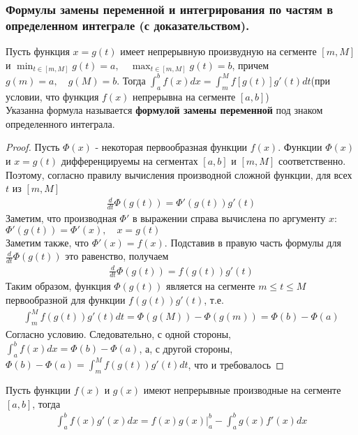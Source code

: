 \documentclass[10pt]{article}
\begin{document}
    \subsubsection{Формулы замены переменной и интегрирования по частям в определенном интеграле (с доказательством).}
    \begin{theorem}
        Пусть функция $x = g(t)$ имеет непрерывную произвудную на сегменте $[m, M]$ и $\min_{t \in [m, M]} g(t) = a, \quad \max_{t \in [m, M]} g(t) = b$, причем $g(m) = a, \quad g(M) = b$. Тогда $\int_a^b f(x) dx = \int_m^M f[g(t)]g'(t) dt$(при условии, что функция $f(x)$ непрерывна на сегменте $[a, b]$)\\
        Указанна формула называется \textbf{формулой замены переменной} под знаком определенного интеграла.
    \end{theorem}
    \begin{proof}
        Пусть $\Phi(x)$ - некоторая первообразная функции $f(x)$. Функции $\Phi(x)$ и $x = g(t)$ дифференцируемы на сегментах $[a, b]$ и $[m, M]$ соответственно. Поэтому, согласно правилу вычисления производной сложной функции, для всех $t$ из $[m, M]$
        \begin{gather*}
            \frac{d}{dt} \Phi(g(t)) = \Phi'(g(t))g'(t)
        \end{gather*}
        Заметим, что производная $\Phi'$ в выражении справа вычислена по аргументу $x$: $\Phi'(g(t)) = \Phi'(x), \quad x = g(t)$\\
        Заметим также, что $\Phi'(x) = f(x)$. Подставив в правую часть формулы для $\frac{d}{dt}\Phi(g(t))$ это равенство, получаем
        \begin{gather*}
            \frac{d}{dt}\Phi(g(t)) = f(g(t))g'(t)
        \end{gather*}
        Таким образом, функция $\Phi(g(t))$ является на сегменте $m \leq t \leq M$ первообразной для функции $f(g(t))g'(t)$, т.е.
        \begin{gather*}
            \int_m^M f(g(t))g'(t) dt = \Phi(g(M)) - \Phi(g(m)) = \Phi(b) - \Phi(a)
        \end{gather*}
        Согласно условию. Следовательно, с одной стороны, $\int_a^b f(x) dx = \Phi(b) - \Phi(a)$, а, с другой стороны, $\Phi(b) - \Phi(a) = \int_m^M f(g(t))g'(t) dt$, что и требовалось
    \end{proof}
    \begin{theorem}
        Пусть функции $f(x)$ и $g(x)$ имеют непрерывные производные на сегменте $[a, b]$, тогда
        \begin{gather*}
            \int_a^b f(x)g'(x) dx = f(x)g(x)|_a^b - \int_a^b g(x)f'(x) dx
        \end{gather*}
    \end{theorem}
\end{document}
